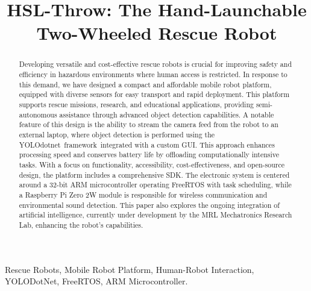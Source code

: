 \documentclass[conference]{IEEEtran}
\begin{document}
\title{HSL-Throw: The Hand-Launchable Two-Wheeled Rescue Robot}

\author{
\and
{}
}
\maketitle

\begin{abstract}
Developing versatile and cost-effective rescue robots is crucial for improving safety and efficiency in hazardous environments where human access is restricted. In response to this demand, we have designed a compact and affordable mobile robot platform, equipped with diverse sensors for easy transport and rapid deployment. This platform supports rescue missions, research, and educational applications, providing semi-autonomous assistance through advanced object detection capabilities. A notable feature of this design is the ability to stream the camera feed from the robot to an external laptop, where object detection is performed using the \mbox{YOLOdotnet framework integrated} with a custom GUI. This approach enhances processing speed and conserves battery life by offloading computationally intensive tasks. With a focus on functionality, accessibility, cost-effectiveness, and open-source design, the platform includes a comprehensive SDK. The electronic system is centered around a 32-bit ARM microcontroller operating FreeRTOS with task scheduling, while a Raspberry Pi Zero 2W module is responsible for wireless communication and environmental sound detection. This paper also explores the ongoing integration of artificial intelligence, currently under development by the MRL Mechatronics Research Lab, enhancing the robot's capabilities.\\
\end{abstract}

\begin{IEEEkeywords}
Rescue Robots, Mobile Robot Platform, Human-Robot Interaction, YOLODotNet, FreeRTOS, ARM Microcontroller.
\end{IEEEkeywords}
\end{document}
